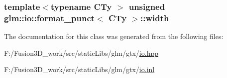 \subsubsection[{width}]{\setlength{\rightskip}{0pt plus 5cm}template$<$typename C\+Ty $>$ unsigned {\bf glm\+::io\+::format\+\_\+punct}$<$ C\+Ty $>$\+::{\bf width}}\label{classglm_1_1io_1_1format__punct_a95d32ca2330bbf7c50d3e066b7a851db}


The documentation for this class was generated from the following files\+:\begin{DoxyCompactItemize}
\item 
F\+:/\+Fusion3\+D\+\_\+work/src/static\+Libs/glm/gtx/\hyperlink{io_8hpp}{io.\+hpp}\item 
F\+:/\+Fusion3\+D\+\_\+work/src/static\+Libs/glm/gtx/\hyperlink{io_8inl}{io.\+inl}\end{DoxyCompactItemize}
